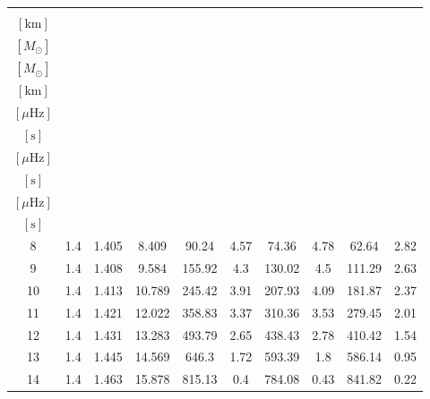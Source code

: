 \begin{tabular}{cccccccccc}
\toprule
\makecell{$R_{\rm cci}$ \\[1ex] $[\text{km}]$} & \makecell{$M_{\rm core}$ \\[1ex] $[M_{\odot}]$} & \makecell{$M_{\rm NS}$ \\[1ex] $[M_{\odot}]$} & \makecell{$R_{\rm NS}$ \\[1ex] $[\text{km}]$} & \makecell{$\Delta\nu_{\rm max, A}$ \\[1ex] $[\mu\text{Hz}]$} & \makecell{$t_{\rm max, A}$ \\[1ex] $[\text{s}]$} & \makecell{$\Delta\nu_{\rm max, B}$ \\[1ex] $[\mu\text{Hz}]$} & \makecell{$t_{\rm max, B}$ \\[1ex] $[\text{s}]$} & \makecell{$\Delta\nu_{\rm max, C}$ \\[1ex] $[\mu\text{Hz}]$} & \makecell{$t_{\rm max, C}$ \\[1ex] $[\text{s}]$} \\
\midrule
8 & 1.4 & 1.405 & 8.409 & 90.24 & 4.57 & 74.36 & 4.78 & 62.64 & 2.82 \\
9 & 1.4 & 1.408 & 9.584 & 155.92 & 4.3 & 130.02 & 4.5 & 111.29 & 2.63 \\
10 & 1.4 & 1.413 & 10.789 & 245.42 & 3.91 & 207.93 & 4.09 & 181.87 & 2.37 \\
11 & 1.4 & 1.421 & 12.022 & 358.83 & 3.37 & 310.36 & 3.53 & 279.45 & 2.01 \\
12 & 1.4 & 1.431 & 13.283 & 493.79 & 2.65 & 438.43 & 2.78 & 410.42 & 1.54 \\
13 & 1.4 & 1.445 & 14.569 & 646.3 & 1.72 & 593.39 & 1.8 & 586.14 & 0.95 \\
14 & 1.4 & 1.463 & 15.878 & 815.13 & 0.4 & 784.08 & 0.43 & 841.82 & 0.22 \\
\bottomrule
\end{tabular}
